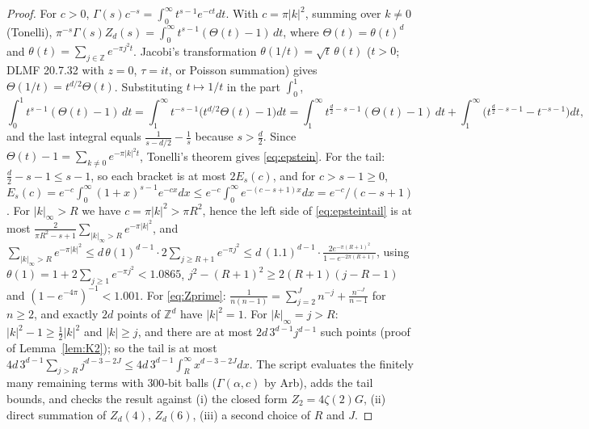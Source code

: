 \documentclass[11pt,a4paper]{article}
\newcommand{\Z}{\mathbb Z}
\theoremstyle{plain}
\theoremstyle{definition}
\numberwithin{equation}{section}
\begin{document}
\begin{proof}
For $c>0$, $\Gamma(s)c^{-s}=\int_0^\infty t^{s-1}e^{-ct}dt$. With $c=\pi|k|^2$, summing over $k\ne0$ (Tonelli),
$\pi^{-s}\Gamma(s)Z_d(s)=\int_0^\infty t^{s-1}(\Theta(t)-1)\,dt$, where $\Theta(t)=\theta(t)^d$ and $\theta(t)=\sum_{j\in\Z}e^{-\pi j^2t}$. Jacobi's transformation $\theta(1/t)=\sqrt t\,\theta(t)$ ($t>0$; DLMF 20.7.32 with $z=0$, $\tau=it$, or Poisson summation) gives $\Theta(1/t)=t^{d/2}\Theta(t)$. Substituting $t\mapsto1/t$ in the part $\int_0^1$,
\[
\int_0^1t^{s-1}(\Theta(t)-1)\,dt=\int_1^\infty t^{-s-1}\big(t^{d/2}\Theta(t)-1\big)dt=\int_1^\infty t^{\frac d2-s-1}(\Theta(t)-1)\,dt+\int_1^\infty\big(t^{\frac d2-s-1}-t^{-s-1}\big)dt,
\]
and the last integral equals $\frac{1}{s-d/2}-\frac1s$ because $s>\frac d2$. Since $\Theta(t)-1=\sum_{k\ne0}e^{-\pi|k|^2t}$, Tonelli's theorem gives \eqref{eq:epstein}.
For the tail: $\frac d2-s-1\le s-1$, so each bracket is at most $2E_s(c)$, and for $c>s-1\ge0$, $E_s(c)=e^{-c}\int_0^\infty(1+x)^{s-1}e^{-cx}dx\le e^{-c}\int_0^\infty e^{-(c-s+1)x}dx=e^{-c}/(c-s+1)$. For $|k|_\infty>R$ we have $c=\pi|k|^2>\pi R^2$, hence the left side of \eqref{eq:epsteintail} is at most $\frac{2}{\pi R^2-s+1}\sum_{|k|_\infty>R}e^{-\pi|k|^2}$, and
$\sum_{|k|_\infty>R}e^{-\pi|k|^2}\le d\,\theta(1)^{d-1}\cdot2\sum_{j\ge R+1}e^{-\pi j^2}\le d\,(1.1)^{d-1}\cdot\frac{2e^{-\pi(R+1)^2}}{1-e^{-2\pi(R+1)}}$,
using $\theta(1)=1+2\sum_{j\ge1}e^{-\pi j^2}<1.0865$, $j^2-(R+1)^2\ge2(R+1)(j-R-1)$ and $(1-e^{-4\pi})^{-1}<1.001$.
For \eqref{eq:Zprime}: $\frac1{n(n-1)}=\sum_{j=2}^{J}n^{-j}+\frac{n^{-J}}{n-1}$ for $n\ge2$, and exactly $2d$ points of $\Z^d$ have $|k|^2=1$. For $|k|_\infty=j>R$: $|k|^2-1\ge\frac12|k|^2$ and $|k|\ge j$, and there are at most $2d\,3^{d-1}j^{d-1}$ such points (proof of Lemma~\ref{lem:K2}); so the tail is at most $4d\,3^{d-1}\sum_{j>R}j^{d-3-2J}\le4d\,3^{d-1}\int_R^\infty x^{d-3-2J}dx$.
The script evaluates the finitely many remaining terms with $300$-bit balls ($\Gamma(\alpha,c)$ by Arb), adds the tail bounds, and checks the result against (i) the closed form $Z_2=4\zeta(2)G$, (ii) direct summation of $Z_d(4)$, $Z_d(6)$, (iii) a second choice of $R$ and $J$.
\end{proof}
\end{document}
